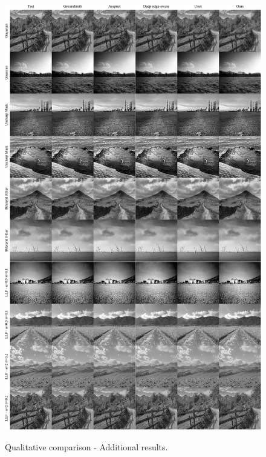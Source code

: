 \begin{figure}[ht]
  \centering

  {\includegraphics[width=0.9\linewidth]{Chapters/appendix-figs/landscape.pdf}}

   \caption{Qualitative comparison - Additional results.}
   \label{fig:appendix-tat2}
\end{figure}

